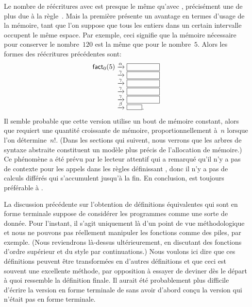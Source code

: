 Le nombre de réécritures avec  est presque le même
qu'avec , précisément une de plus due à la
règle~\clause{\alpha}. Mais la première présente un avantage en termes
d'usage de la mémoire, tant que l'on suppose que tous les entiers dans
un certain intervalle occupent le même espace. Par exemple, ceci
signifie que la mémoire nécessaire pour conserver le nombre~\(120\)
est la même que pour le nombre~\(5\). Alors les formes des réécritures
précédentes sont:
\begin{equation*}
\setlength\fboxsep{0mm}
\begin{array}{r@{\;}c@{\;}l} 
\fun{fact}_0(5)
& \xrightarrow{\smash[t]{\alpha}} &
\fbox{\phantom{$\fun{fact}_0(0,10)$}}\\
& \xrightarrow{\smash[t]{\gamma}} &
\fbox{\phantom{$\fun{fact}_0(0,10)$}}\\
& \xrightarrow{\smash[t]{\gamma}} &
\fbox{\phantom{$\fun{fact}_0(0,10)$}}\\
& \xrightarrow{\smash[t]{\gamma}} &
\fbox{\phantom{$\fun{fact}_0(0,10)$}}\\
& \xrightarrow{\smash[t]{\gamma}} &
\fbox{\phantom{$\fun{fact}_0(0,10)$}}\\
& \xrightarrow{\smash[t]{\beta}} & \fbox{\phantom{CCC}}.
\end{array}
\end{equation*}
Il semble probable que cette version utilise un bout de mémoire
constant, alors que  requiert une quantité croissante de
mémoire, proportionnellement à~\(n\) lorsque l'on
détermine~\(n!\). (Dans les sections qui suivent, nous verrons que les
arbres de syntaxe abstraite constituent un modèle plus précis de
l'allocation de mémoire.) Ce phénomène a été prévu par le lecteur
attentif qui a remarqué qu'il n'y a pas de contexte pour les appels
dans les règles définissant , donc il n'y a pas de
calculs différés qui s'accumulent jusqu'à la fin. En conclusion,
 est toujours préférable à .

La discussion précédente sur l'obtention de définitions équivalentes
qui sont en forme terminale suppose de considérer les programmes comme
une sorte de donnée. Pour l'instant, il s'agit uniquement là d'un
point de vue méthodologique et nous ne pouvons pas réellement
manipuler les fonctions comme des piles, par exemple. (Nous
reviendrons là-dessus ultérieurement, en discutant des fonctions
d'ordre supérieur et du style par continuations.) Nous voulons ici
dire que ces définitions peuvent être transformées en d'autres
définitions et que ceci est souvent une excellente méthode, par
opposition à essayer de deviner dès le départ à quoi ressemble la
définition finale. Il aurait été probablement plus difficile d'écrire
la version en forme terminale de  sans avoir d'abord conçu
la version qui n'était pas en forme terminale.

